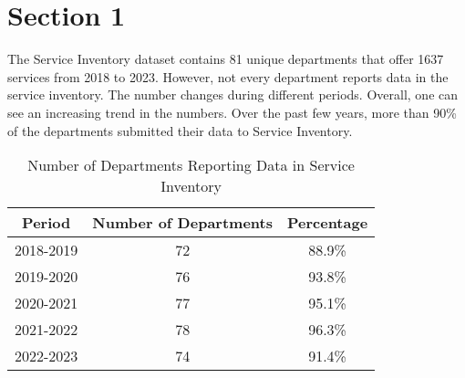 \section{Section 1}

The Service Inventory dataset contains 81 unique departments that offer 1637 
services from 2018 to 2023. However, not every department reports data in the 
service inventory. The number changes during different periods. Overall, one 
can see an increasing trend in the numbers. Over the past few years, more than 
90\% of the departments submitted their data to Service Inventory.

\begin{table}[ht]
    \centering
    \begin{tabular}{|c|c|c|}
    \hline
    Period & Number of Departments & Percentage \\ \hline
    2018-2019 & 72 & 88.9\% \\ \hline
    2019-2020 & 76 & 93.8\% \\ \hline
    2020-2021 & 77 & 95.1\% \\ \hline
    2021-2022 & 78 & 96.3\% \\ \hline
    2022-2023 & 74 & 91.4\% \\ \hline
    \end{tabular}
    \caption{Number of Departments Reporting Data in Service Inventory}
\end{table}
